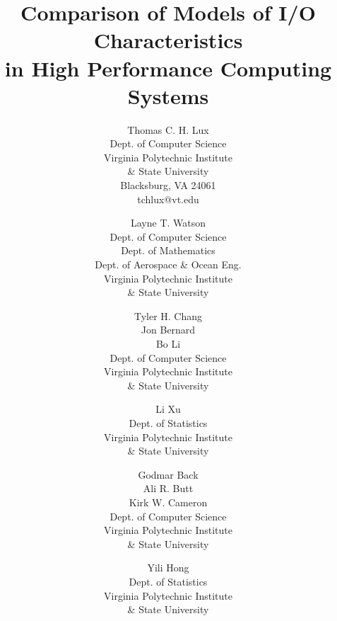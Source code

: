 \documentclass{scspaperproc}
\theoremstyle{scsthe}
\begin{document}

\def\SCSconferenceacro{SpringSim}
\def\SCSpublicationyear{2018}
\def\SCSconferencedates{April 15-18}
\def\SCSconferencevenue{Baltimore, MD, USA}
\def\SCSsymposiumacro{HPC} %

\title{Comparison of Models of I/O Characteristics \\ in High
  Performance Computing Systems}

\author{Thomas C. H. Lux \\ [12pt]
Dept. of Computer Science \\
Virginia Polytechnic Institute\\
\& State University \\
Blacksburg, VA 24061 \\
tchlux@vt.edu \\
\and
Layne T. Watson \\[12pt]
Dept. of Computer Science\\
Dept. of Mathematics\\
Dept. of Aerospace \& Ocean Eng.\\ 
Virginia Polytechnic Institute\\
\& State University \\
\and
Tyler H. Chang\\
Jon Bernard\\
Bo Li\\[12pt]
Dept. of Computer Science\\ 
Virginia Polytechnic Institute\\
\& State University \\
\and
Li Xu\\[12pt]
Dept. of Statistics\\ 
Virginia Polytechnic Institute\\
\& State University \\
\and
Godmar Back\\
Ali R. Butt\\
Kirk W. Cameron\\[12pt]
Dept. of Computer Science\\ 
Virginia Polytechnic Institute\\
\& State University \\
\and
Yili Hong\\[12pt]
Dept. of Statistics\\ 
Virginia Polytechnic Institute\\
\& State University \\
}
\end{document}
